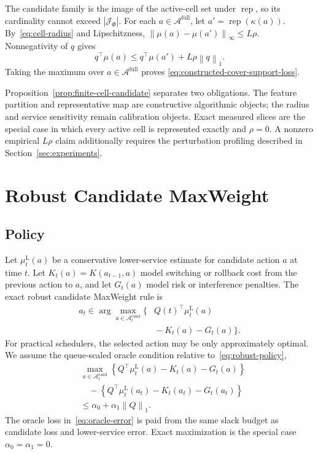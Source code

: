 \documentclass[opre,dblanonrev]{informs4}
\newcommand{\Afull}{\mathcal A^{\mathrm{full}}}
\newcommand{\Acand}{\mathcal A^{\mathrm{cand}}}
\newcommand{\lowermu}{\mu^{\mathrm L}}
\newcommand{\normone}[1]{\left\|#1\right\|_1}
\newcommand{\norminf}[1]{\left\|#1\right\|_\infty}
\begin{document}
The candidate family is the image of the active-cell set under
\(\operatorname{rep}\), so its cardinality cannot exceed
\(|\mathcal J_\Phi|\).  For each \(a\in\Afull\), let
\(a'=\operatorname{rep}(\kappa(a))\).  By~\eqref{eq:cell-radius} and
Lipschitzness,
\(\norminf{\mu(a)-\mu(a')}\le L\rho\).  Nonnegativity of \(q\) gives
\begin{equation}
  q^\top\mu(a)
  \le q^\top\mu(a')+L\rho\normone{q}.
\end{equation}
Taking the maximum over \(a\in\Afull\) proves
\eqref{eq:constructed-cover-support-loss}.
\endproof

Proposition~\ref{prop:finite-cell-candidate} separates two obligations.  The
feature partition and representative map are constructive algorithmic objects;
the radius and service sensitivity remain calibration objects.  Exact measured
slices are the special case in which every active cell is represented exactly
and \(\rho=0\).  A nonzero empirical \(L\rho\) claim additionally requires the
perturbation profiling described in Section~\ref{sec:experiments}.

\section{Robust Candidate MaxWeight}
\label{sec:theory}

\subsection{Policy}
\label{subsec:policy}

Let \(\lowermu_t(a)\) be a conservative lower-service estimate for candidate
action \(a\) at time \(t\).  Let \(K_t(a)=K(a_{t-1},a)\) model switching or
rollback cost from the previous action to \(a\), and let \(G_t(a)\) model risk
or interference penalties.  The exact robust candidate MaxWeight rule is
\begin{equation}
  \begin{aligned}
  a_t\in\arg\max_{a\in\Acand_t}
  \bigl\{&
    Q(t)^\top\lowermu_t(a)\\
    &{}-K_t(a)-G_t(a)
  \bigr\}.
  \end{aligned}
  \label{eq:robust-policy}
\end{equation}
For practical schedulers, the selected action may be only approximately optimal.
We assume the queue-scaled oracle condition relative to~\eqref{eq:robust-policy},
\begin{equation}
  \begin{aligned}
  &\max_{a\in\Acand_t}
  \left\{Q^\top\lowermu_t(a)-K_t(a)-G_t(a)\right\}\\
  &\quad{}-
  \left\{Q^\top\lowermu_t(a_t)-K_t(a_t)-G_t(a_t)\right\}\\
  &\le \alpha_0+\alpha_1\normone{Q}.
  \end{aligned}
  \label{eq:oracle-error}
\end{equation}
The oracle loss in~\eqref{eq:oracle-error} is paid from the same slack budget as
candidate loss and lower-service error.  Exact maximization is the special case
\(\alpha_0=\alpha_1=0\).
\end{document}
